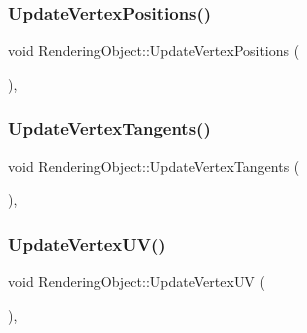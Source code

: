 \hypertarget{class_rendering_object_a7a097727acf37f9671ddd5e3a9873771}{}\label{class_rendering_object_a7a097727acf37f9671ddd5e3a9873771}
\subsubsection{\texorpdfstring{Update\+Vertex\+Positions()}{UpdateVertexPositions()}}
{\footnotesize\ttfamily void Rendering\+Object\+::\+Update\+Vertex\+Positions (\begin{DoxyParamCaption}{ }\end{DoxyParamCaption})\hspace{0.3cm}{\ttfamily [protected]}, {\ttfamily [virtual]}}

\hypertarget{class_rendering_object_a5b480a9b97cadfa07669902764139272}{}\label{class_rendering_object_a5b480a9b97cadfa07669902764139272}
\subsubsection{\texorpdfstring{Update\+Vertex\+Tangents()}{UpdateVertexTangents()}}
{\footnotesize\ttfamily void Rendering\+Object\+::\+Update\+Vertex\+Tangents (\begin{DoxyParamCaption}{ }\end{DoxyParamCaption})\hspace{0.3cm}{\ttfamily [protected]}, {\ttfamily [virtual]}}

\hypertarget{class_rendering_object_ac00889f2afaa605b09164649ef68a1b6}{}\label{class_rendering_object_ac00889f2afaa605b09164649ef68a1b6}
\subsubsection{\texorpdfstring{Update\+Vertex\+U\+V()}{UpdateVertexUV()}}
{\footnotesize\ttfamily void Rendering\+Object\+::\+Update\+Vertex\+UV (\begin{DoxyParamCaption}{ }\end{DoxyParamCaption})\hspace{0.3cm}{\ttfamily [protected]}, {\ttfamily [virtual]}}



